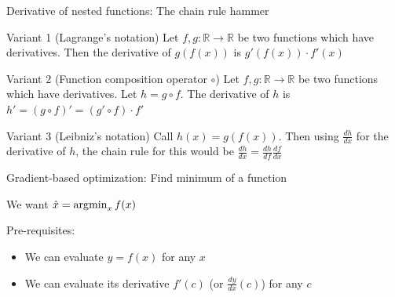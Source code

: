 \documentclass[12pt,aspectratio=169,handout]{beamer}
\begin{document}
\begin{frame}{Derivative of nested functions: The chain rule hammer}
	
	
	\begin{block}{Variant 1 (Lagrange's notation)}
		Let $f, g : \mathbb{R} \to \mathbb{R}$ be two functions which have derivatives. Then the derivative of $g (f(x))$ is $g' (f(x)) \cdot f' (x)$
	\end{block}
	\pause
	
	\begin{block}{Variant 2 (Function composition operator $\circ$)}
		Let $f, g : \mathbb{R} \to \mathbb{R}$ be two functions which have derivatives. Let $h = g \circ f$. The derivative of $h$ is $h'=(g \circ f)'=(g'\circ f)\cdot f'$
	\end{block}
	\pause
	
\begin{block}{Variant 3 (Leibniz's notation)}
		Call $h(x) = g(f(x))$. Then using $\frac{dh}{dx}$ for the derivative of $h$, the chain rule for this would be $\frac{dh}{dx} = \frac{dh}{df} \frac{df}{dx}$
	\end{block}
	
\end{frame}




\begin{frame}{Gradient-based optimization: Find minimum of a function}
	
	We want $\hat{x} = \operatorname*{arg\!\min}_x f(x)$
	
	Pre-requisites:
	
	\begin{itemize}
		\item We can evaluate $y = f(x)$ for any $x$
		\item We can evaluate its derivative $f'(c)$ (or $\frac{dy}{dx}(c)$) for any $c$
	\end{itemize}


\begin{figure}
\end{figure}





\end{frame}
\end{document}
